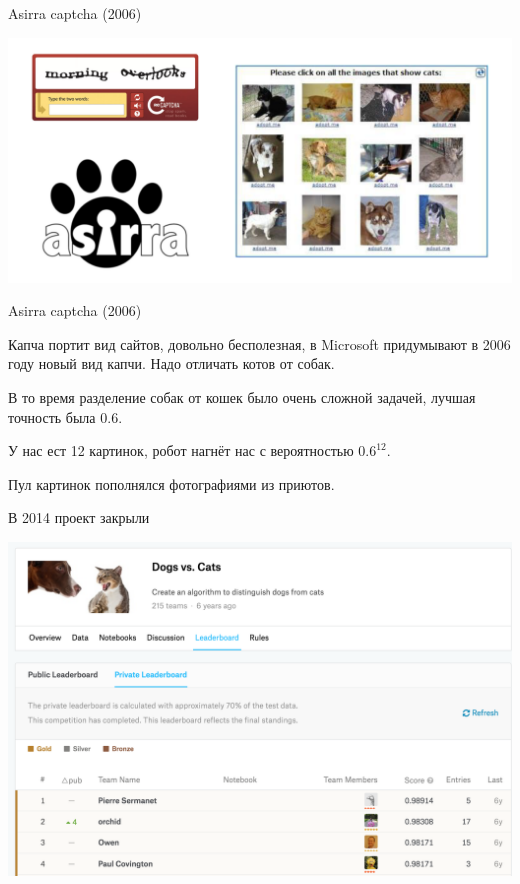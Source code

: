 \documentclass[notes,12pt, aspectratio=169]{beamer}
\newenvironment{wideitemize}{\itemize\addtolength{\itemsep}{10pt}}{\enditemize}
\begin{document}
\begin{frame}{Asirra captcha (2006)}
\begin{center}
	\includegraphics[width=.9\linewidth]{asira_capcha.png}
\end{center}
\end{frame}


\begin{frame}{Asirra captcha (2006)}
\begin{wideitemize}
	\item Капча портит вид сайтов, довольно бесполезная, в Microsoft придумывают в 2006 году новый вид капчи. Надо отличать котов от собак. 
	\item В то время разделение собак от кошек было очень сложной задачей, лучшая точность была $0.6$. 
	\item У нас ест 12 картинок, робот нагнёт нас с вероятностью $0.6^{12}$. 
	\item Пул картинок пополнялся фотографиями из приютов. 
\end{wideitemize} 
\end{frame}


\begin{frame}{В 2014 проект закрыли}
\begin{center}
	\includegraphics[width=.75\linewidth]{dogs_vs_cat.png}
\end{center}
\end{frame}
\end{document}
